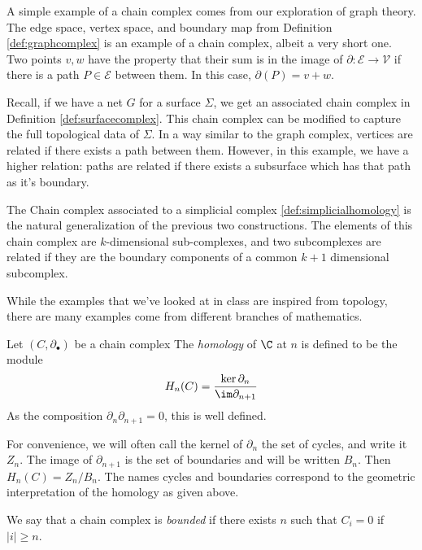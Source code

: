 \begin{example}
A simple example of a chain complex comes from our exploration of graph theory. The edge space, vertex space, and boundary map from Definition \ref{def:graphcomplex} is an example of a chain complex, albeit a very short one. Two points $v, w$ have the property that their sum is in the image of $\partial: \mathcal E\to \mathcal V$ if there is a path $P\in\mathcal E$ between them. In this case, $\partial(P)=v+w$. 
\end{example}
\begin{example}
Recall, if we have a net $G$ for a surface $\Sigma$, we get an associated chain complex in Definition \ref{def:surfacecomplex}. This chain complex can be modified to capture the full topological data of $\Sigma$. In a way similar to the graph complex, vertices are related if there exists a path between them. However, in this example, we have a higher relation: paths are related if there exists a subsurface which has that path as it's boundary. 
\end{example}
\begin{example}
The Chain complex associated to a simplicial complex \ref{def:simplicialhomology} is the natural generalization of the previous two constructions. The elements of this chain complex are $k$-dimensional sub-complexes, and two subcomplexes are related if they are the boundary components of a common $k+1$ dimensional subcomplex.
\end{example}
While the examples that we've looked at in class are inspired from topology, there are many examples come from different branches of mathematics. 
\begin{definition} Let $(C,\partial_\bullet)$ be a chain complex The \emph{homology} of $\C$ at $n$ is defined to be the module 
\[H_n(C)=\frac{\ker \partial_n}{ \im \partial_{n+1}}\]
 As the composition $\partial_n \partial_{n+1}=0$, this is well defined.
 \label{def:homologygroups}
\end{definition}
For convenience, we will often call the kernel of $\partial_{n}$ the set of cycles, and write it $Z_n$. The image of $\partial_{n+1}$ is the set of boundaries and will be written $B_n$. Then $H_n(C)=Z_n/B_n$. The names cycles and boundaries correspond to the geometric interpretation of the homology as given above.  
\begin{definition} We say that a chain complex is \emph{bounded} if there exists $n$ such that $C_i=0$ if $|i|\geq n$.
\end{definition}
